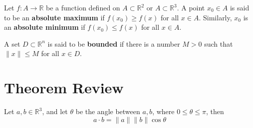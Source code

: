 \documentclass[openany]{book}
\newcommand{\R}{\mathbb{R}}
\begin{document}
\begin{defn}
    Let $f:A\to\R$ be a function defined on $A\subset\R^2$ or $A\subset\R^3$. A point $x_0\in A$ is said to be an \textbf{absolute maximum} if $f(x_0)\geq f(x)$ for all $x\in A$. Similarly, $x_0$ is an \textbf{absolute minimum} if $f(x_0)\leq f(x)$ for all $x\in A$. 
\end{defn}

\begin{defn}
    A set $D\subset\R^n$ is said to be \textbf{bounded} if there is a number $M>0$ such that $\|x\|\leq M$ for all $x\in D$. 
\end{defn}










































\newpage

\chapter{Theorem Review}
\begin{prop}\label{dot}
    Let $a,b\in\R^3$, and let $\theta$ be the angle between $a,b$, where $0\leq\theta\leq\pi$, then 
    \begin{equation*}
        a\cdot b=\|a\|\|b\|\cos\theta
    \end{equation*}
\end{prop}
\end{document}
